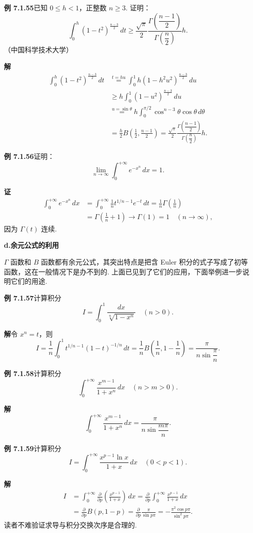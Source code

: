 \documentclass[UTF8,12pt,a4paper,fontset=fandol]{ctexart}
\begin{document}
\noindent\textbf{例 7.1.55}\quad 已知 $0\le h<1$，正整数 $n\ge3$. 证明：
\[
\int_0^h(1-t^2)^{\frac{n-3}{2}}\,dt
\ge \frac{\sqrt\pi}{2}\frac{\Gamma\left(\dfrac{n-1}{2}\right)}
{\Gamma\left(\dfrac n2\right)}h.
\]
（中国科学技术大学）

\noindent\textbf{解}\quad
\[
\begin{aligned}
\int_0^h(1-t^2)^{\frac{n-3}{2}}\,dt
&\overset{t=hu}{=}\int_0^1h(1-h^2u^2)^{\frac{n-3}{2}}\,du\\
&\ge h\int_0^1(1-u^2)^{\frac{n-3}{2}}\,du\\
&\overset{u=\sin\theta}{=}h\int_0^{\pi/2}\cos^{n-3}\theta\cos\theta\,d\theta\\
&=\frac h2 B\left(\frac12,\frac{n-1}{2}\right)
=\frac{\sqrt\pi}{2}\frac{\Gamma\left(\dfrac{n-1}{2}\right)}
{\Gamma\left(\dfrac n2\right)}h.
\end{aligned}
\]

\noindent\textbf{例 7.1.56}\quad 证明：
\[
\lim_{n\to\infty}\int_0^{+\infty}e^{-x^n}\,dx=1.
\]

\noindent\textbf{证}\quad
\[
\begin{aligned}
\int_0^{+\infty}e^{-x^n}\,dx
&=\int_0^{+\infty}\frac1n t^{1/n-1}e^{-t}\,dt
=\frac1n\Gamma\left(\frac1n\right)\\
&=\Gamma\left(\frac1n+1\right)\to\Gamma(1)=1\quad(n\to\infty),
\end{aligned}
\]
因为 $\Gamma(t)$ 连续.

\noindent\textbf{d.\quad 余元公式的利用}

$\Gamma$ 函数和 $B$ 函数都有余元公式，其突出特点是把含 Euler 积分的式子写成了初等函数，这在一般情况下是办不到的. 上面已见到了它们的应用，下面举例进一步说明它们的用途.

\noindent\textbf{例 7.1.57}\quad 计算积分
\[
I=\int_0^1\frac{dx}{\sqrt[n]{1-x^n}}\quad(n>0).
\]

\noindent\textbf{解}\quad 令 $x^n=t$，则
\[
I=\frac1n\int_0^1t^{1/n-1}(1-t)^{-1/n}\,dt
=\frac1nB\left(\frac1n,1-\frac1n\right)
=\frac{\pi}{n\sin\dfrac\pi n}.
\]

\noindent\textbf{例 7.1.58}\quad 计算积分
\[
\int_0^{+\infty}\frac{x^{m-1}}{1+x^n}\,dx\quad(n>m>0).
\]

\noindent\textbf{解}\quad
\[
\int_0^{+\infty}\frac{x^{m-1}}{1+x^n}\,dx
=\frac{\pi}{n\sin\dfrac{m\pi}{n}}.
\]

\noindent\textbf{例 7.1.59}\quad 计算积分
\[
I=\int_0^{+\infty}\frac{x^{p-1}\ln x}{1+x}\,dx\quad(0<p<1).
\]

\noindent\textbf{解}\quad
\[
\begin{aligned}
I&=\int_0^{+\infty}\frac{\partial}{\partial p}\left(\frac{x^{p-1}}{1+x}\right)\,dx
=\frac{\partial}{\partial p}\int_0^{+\infty}\frac{x^{p-1}}{1+x}\,dx\\
&=\frac{\partial}{\partial p}B(p,1-p)
=\frac{\partial}{\partial p}\frac{\pi}{\sin p\pi}
=-\frac{\pi^2\cos p\pi}{\sin^2p\pi}.
\end{aligned}
\]
读者不难验证求导与积分交换次序是合理的.
\end{document}
